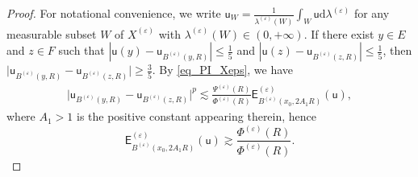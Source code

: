 \documentclass[11pt,a4paper]{article}
\numberwithin{equation}{section}
\theoremstyle{plain}
\theoremstyle{definition}
\begin{document}
\begin{proof}
For notational convenience, we write $\mathsf{u}_W=\frac{1}{\lambda^{(\varepsilon)}(W)}\int_W\mathsf{u}\mathrm{d}\lambda^{(\varepsilon)}$ for any measurable subset $W$ of $X^{(\varepsilon)}$ with $\lambda^{(\varepsilon)}(W)\in(0,+\infty)$.
If there exist $y\in E$ and $z\in F$ such that $|\mathsf{u}(y)-\mathsf{u}_{B^{(\varepsilon)}(y,R)}|\le \frac{1}{5}$ and $|\mathsf{u}(z)-\mathsf{u}_{B^{(\varepsilon)}(z,R)}|\le \frac{1}{5}$, then $\lvert \mathsf{u}_{B^{(\varepsilon)}(y,R)}-\mathsf{u}_{B^{(\varepsilon)}(z,R)}\rvert\ge \frac{3}{5}$. By \ref{eq_PI_Xeps}, we have 
\begin{align*}
\lvert \mathsf{u}_{B^{(\varepsilon)}(y,R)}-\mathsf{u}_{B^{(\varepsilon)}(z,R)}\rvert^p\lesssim \frac{\Psi^{(\varepsilon)}(R)}{\Phi^{(\varepsilon)}(R)}\mathsf{E}^{(\varepsilon)}_{B^{(\varepsilon)}(x_0,2A_1R)}(\mathsf{u}),
\end{align*}
where $A_1>1$ is the positive constant appearing therein, hence
$$\mathsf{E}^{(\varepsilon)}_{B^{(\varepsilon)}(x_0,2A_1R)}(\mathsf{u})\gtrsim \frac{\Phi^{(\varepsilon)}(R)}{\Phi^{(\varepsilon)}(R)}.$$


\end{proof}
\end{document}
